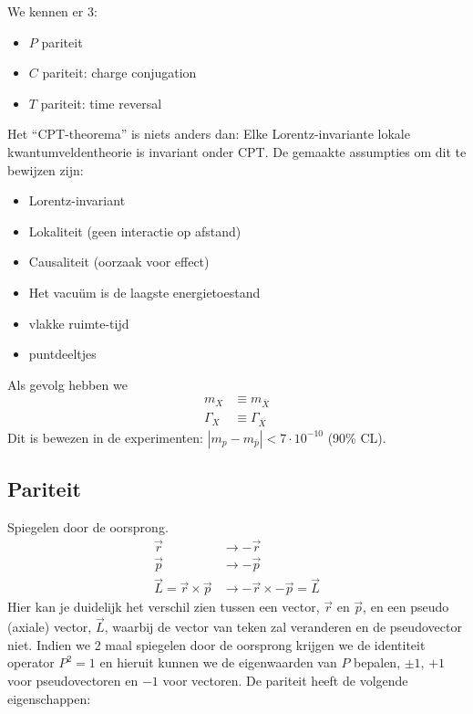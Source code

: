 \documentclass[../main.tex]{subfiles}
\begin{document}
We kennen er 3:
\begin{itemize}
    \item $P$ pariteit
    \item $C$ pariteit: charge conjugation
    \item $T$ pariteit: time reversal
\end{itemize}
Het ``CPT-theorema'' is niets anders dan: Elke Lorentz-invariante lokale kwantumveldentheorie is invariant onder CPT. De gemaakte assumpties om dit te bewijzen zijn:
\begin{itemize}
    \item Lorentz-invariant
    \item Lokaliteit (geen interactie op afstand)
    \item Causaliteit (oorzaak voor effect)
    \item Het vacuüm is de laagste energietoestand
    \item vlakke ruimte-tijd
    \item puntdeeltjes
\end{itemize}
Als gevolg hebben we
\begin{equation}
    \begin{aligned}
        \label{eq:CPT_gevolgen}
        m_X&\equiv m_{\overline X}\\
        \Gamma_X&\equiv \Gamma_{\overline X}
    \end{aligned}
\end{equation}
Dit is bewezen in de experimenten: $|m_p-m_{\overline p}|<7\cdot10^{-10}$ (90\% CL).

\subsection{Pariteit}%
\label{sub:pariteit}

Spiegelen door de oorsprong.
\begin{equation}
    \begin{aligned}
        \label{eq:pariteit}
        \vec{r}&\rightarrow -\vec{r}\\
        \vec{p}&\rightarrow -\vec{p}\\
        \vec{L} = \vec{r}\times\vec{p}&\rightarrow -\vec{r} \times -\vec{p} = \vec{L}
    \end{aligned}
\end{equation}
Hier kan je duidelijk het verschil zien tussen een vector, $\vec{r}$ en $\vec{p}$, en een pseudo (axiale) vector, $\vec{L}$, waarbij de vector van teken zal veranderen en de pseudovector niet. Indien we 2 maal spiegelen door de oorsprong krijgen we de identiteit operator $P^2=1$ en hieruit kunnen we de eigenwaarden van $P$ bepalen, $\pm1$, $+1$ voor pseudovectoren en $-1$ voor vectoren. De pariteit heeft de volgende eigenschappen:
\end{document}
